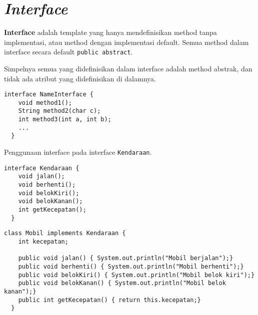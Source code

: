 \documentclass{../praktikum-ppt}
\begin{document}
\section{\textit{Interface}}
\begin{frame}{\insertsection}
  \begin{definisi}
    \textbf{Interface} adalah template yang hanya mendefinisikan method tanpa implementasi, atau method dengan implementasi default. Semua method dalam interface secara default \texttt{public abstract}.
  \end{definisi}
  Simpelnya semua yang didefinisikan dalam interface adalah method abstrak, dan tidak ada atribut yang didefinisikan di dalamnya.  
\end{frame}

\begin{frame}[fragile]{\insertsection}
  \begin{lstlisting}[caption={Syntax Interface}]
  interface NameInterface {
    void method1();
    String method2(char c);
    int method3(int a, int b);
    ...
  }
  \end{lstlisting}
\end{frame}

\begin{frame}[fragile]{\insertsection}
  \begin{contoh}
    Penggunaan interface pada interface \texttt{Kendaraan}.
  \end{contoh}
  \begin{lstlisting}[caption={Contoh Interface}]
  interface Kendaraan {
    void jalan();
    void berhenti();
    void belokKiri();
    void belokKanan();
    int getKecepatan();
  }
  \end{lstlisting}
\end{frame}

\begin{frame}[fragile]{\insertsection}
  \begin{lstlisting}[caption={Contoh Kelas Implementasi Interface}]
  class Mobil implements Kendaraan {
    int kecepatan;

    public void jalan() { System.out.println("Mobil berjalan");}
    public void berhenti() { System.out.println("Mobil berhenti");}
    public void belokKiri() { System.out.println("Mobil belok kiri");}
    public void belokKanan() { System.out.println("Mobil belok kanan");}
    public int getKecepatan() { return this.kecepatan;}
  }
  \end{lstlisting}
\end{frame}
\end{document}
